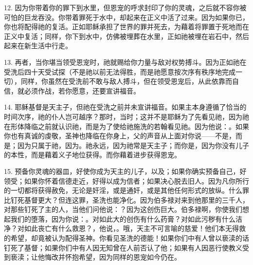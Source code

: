 12. 因为你带着你的罪下到水里，但恩宠的呼求封印了你的灵魂，之后就不容你被可怕的巨龙吞没。你带着罪死于水中，却起来在正义中活了过来。因为如果你已，你也将配得祂的复活。正如耶稣承担了世界的罪并死去，为藉着将罪置于死地而在正义中复活；同样，你下到水中，仿佛被埋葬在水里，正如祂被埋在岩石中，然后起来在新生活中行走。\par

13. 再者，当你堪当领受恩宠时，祂就赐给你力量与敌对权势搏斗。因为正如祂在受洗后四十天受试探（不是祂以前无法得胜，而是祂愿意按次序有秩序地完成一切），同样，你虽然在受洗前不敢与敌人搏斗，但在领受恩宠后，从此依靠而自信，就必须作战，若你愿意，还要宣讲福音。\par

14. 耶稣基督是天主子，但祂在受洗之前并未宣讲福音。如果主本身遵循了恰当的时间次序，祂的仆人岂可越序？那时，当时；这并不是耶稣为了先看见祂，因为祂在形体降临之前就认识祂，而是为了使给祂施洗的若翰看见祂。因为他说：。如果你也有真诚的虔敬，圣神也降临在你身上，父的声音从上面对你说——不是，而是；因为只属于祂，因为。祂永远，因为祂常是天主子；而你是，因为你没有儿子的本性，而是藉着义子地位获得。而你藉着进步获得恩宠。\par

15. 预备你灵魂的器皿，好使你成为天主的儿子，以及；如果你确实预备自己，好领受；如果你怀着信德走近，好得以成为信者；如果决心脱去旧人。因为凡你所行的一切都将获得赦免，无论是奸淫，或是通奸，或是其他任何形式的放纵。什么罪比钉死基督更大？但连这罪，圣洗也能净化。因为伯多禄对来到他那里的三千人，对那些钉死了主的人，当他们问他说：？因为这创伤巨大。伯多禄啊，你使我们想起我们的堕落，因为你说：。对如此大的创伤有什么药膏？对如此污秽有什么洁净？对如此丧亡有什么救恩？，他说，。哦，天主不可言喻的慈爱！他们本无得救的希望，却竟被认为配得圣神。你看见圣洗的德能！如果你们中有人曾以亵渎的话钉死了基督；如果你们中有人因无知曾在人前否认了他；如果有人因恶行使教义受到亵渎；让他悔改并怀抱希望，因为同样的恩宠如今仍在。\par

